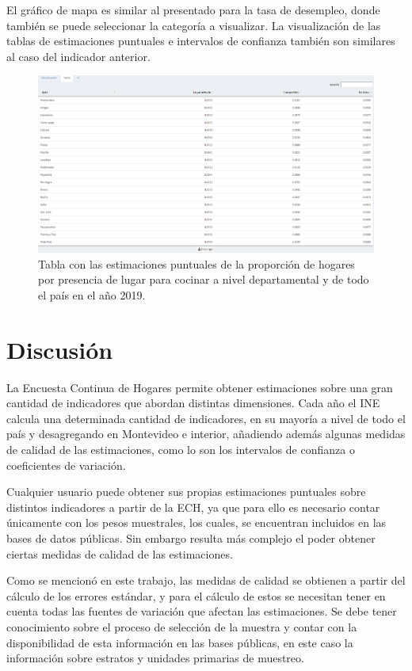 \documentclass[12pt,twoside,spanish,a4paper]{book}\usepackage[]{graphicx}\usepackage[]{color}
\begin{document}
El gráfico de mapa es similar al presentado para la tasa de desempleo, donde también se puede seleccionar la categoría a visualizar. La visualización de las tablas de estimaciones puntuales e intervalos de confianza también son similares al caso del indicador anterior.

\begin{figure}[htb]
\begin{center}
\includegraphics[width=1.2\textwidth]{img/tabla_hog.PNG}
\caption{Tabla con las estimaciones puntuales de la proporción de hogares por presencia de lugar para cocinar a nivel departamental y de todo el país en el año 2019. \label{tabl2}}
\end{center}
\end{figure}

\chapter{Discusión \label{cap:discu}}

La Encuesta Continua de Hogares permite obtener estimaciones sobre una gran cantidad de indicadores que abordan distintas dimensiones. Cada año el INE calcula una determinada cantidad de indicadores, en su mayoría a nivel de todo el país y desagregando en Montevideo e interior, añadiendo además algunas medidas de calidad de las estimaciones, como lo son los intervalos de confianza o coeficientes de variación.

Cualquier usuario puede obtener sus propias estimaciones puntuales sobre distintos indicadores a partir de la ECH, ya que para ello es necesario contar únicamente con los pesos muestrales, los cuales, se encuentran incluidos en las bases de datos públicas. Sin embargo resulta más complejo el poder obtener ciertas medidas de calidad de las estimaciones.

Como se mencionó en este trabajo, las medidas de calidad se obtienen a partir del cálculo de los errores estándar, y para el cálculo de estos se necesitan tener en cuenta todas las fuentes de variación que afectan las estimaciones. Se debe tener conocimiento sobre el proceso de selección de la muestra y contar con la disponibilidad de esta información en las bases públicas, en este caso la información sobre estratos y unidades primarias de muestreo.
\end{document}
